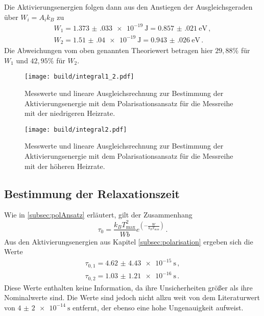Die Aktivierungsenergien folgen dann aus den Anstiegen der
Ausgleichsgeraden über $W_i=A_i k_B$ zu
\begin{align*}
	W_1=\SI{1.373(033)e-19}{\joule}=\SI{0.857(021)}{\eV} \,, \\
	W_2=\SI{1.51(04)e-19}{\joule}=\SI{0.943(026)}{\eV} \,.
\end{align*}
Die Abweichungen vom oben genannten Theoriewert betragen hier
$29{,}88\%$ für $W_1$ und $42{,}95\%$ für $W_2$.

\begin{figure}
  \centering
  \texttt{[image: build/integral1\_2.pdf]}
  \caption{Messwerte und lineare Ausgleichsrechnung zur Bestimmung der Aktivierungsenergie mit dem Polarisationsansatz für
  die Messreihe mit der niedrigeren Heizrate.}
  \label{fig:integral1_2}
\end{figure}
\begin{figure}
  \centering
  \texttt{[image: build/integral2.pdf]}
  \caption{Messwerte und lineare Ausgleichsrechnung zur Bestimmung der Aktivierungsenergie mit dem Polarisationsansatz für
  die Messreihe mit der höheren Heizrate.}
  \label{fig:integral2}
\end{figure}

\subsection{Bestimmung der Relaxationszeit}

Wie in \ref{subsec:polAnsatz} erläutert, gilt der Zusammenhang
\begin{equation*}
	\tau_0=\frac{k_B T_{\text{max}}^2}{W b} e^{\left(-\frac{W}{k_B T_{\text{max}}}\right)} \,.
\end{equation*}
Aus den Aktivierungsenergien aus Kapitel \ref{subsec:polarisation} ergeben sich die Werte
\begin{align*}
	\tau_{0,1}=\SI{4.62(443)e-15}{\second} \,, \\
	\tau_{0,2}=\SI{1.03(121)e-16}{\second} \,.
\end{align*}
\cite{Grund für große Fehler?}
Diese Werte enthalten keine Information, da ihre Unsicherheiten größer als ihre Nominalwerte sind. Die Werte sind jedoch nicht allzu weit von dem Literaturwert von $\SI{4(2)e-14}{\second}$ \cite{lit} entfernt, der ebenso eine hohe Ungenauigkeit aufweist.
